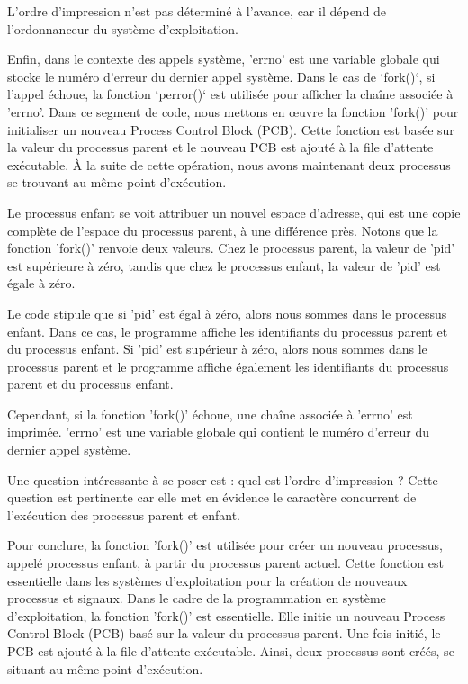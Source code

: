 \documentclass[12pt]{article}
\begin{document}
L'ordre d'impression n'est pas déterminé à l'avance, car il dépend de l'ordonnanceur du système d'exploitation.

Enfin, dans le contexte des appels système, 'errno' est une variable globale qui stocke le numéro d'erreur du dernier appel système. Dans le cas de `fork()`, si l'appel échoue, la fonction `perror()` est utilisée pour afficher la chaîne associée à 'errno'.
Dans ce segment de code, nous mettons en œuvre la fonction 'fork()' pour initialiser un nouveau Process Control Block (PCB). Cette fonction est basée sur la valeur du processus parent et le nouveau PCB est ajouté à la file d'attente exécutable. À la suite de cette opération, nous avons maintenant deux processus se trouvant au même point d'exécution.

Le processus enfant se voit attribuer un nouvel espace d'adresse, qui est une copie complète de l'espace du processus parent, à une différence près. Notons que la fonction 'fork()' renvoie deux valeurs. Chez le processus parent, la valeur de 'pid' est supérieure à zéro, tandis que chez le processus enfant, la valeur de 'pid' est égale à zéro.

Le code stipule que si 'pid' est égal à zéro, alors nous sommes dans le processus enfant. Dans ce cas, le programme affiche les identifiants du processus parent et du processus enfant. Si 'pid' est supérieur à zéro, alors nous sommes dans le processus parent et le programme affiche également les identifiants du processus parent et du processus enfant.

Cependant, si la fonction 'fork()' échoue, une chaîne associée à 'errno' est imprimée. 'errno' est une variable globale qui contient le numéro d'erreur du dernier appel système.

Une question intéressante à se poser est : quel est l'ordre d'impression ? Cette question est pertinente car elle met en évidence le caractère concurrent de l'exécution des processus parent et enfant.

Pour conclure, la fonction 'fork()' est utilisée pour créer un nouveau processus, appelé processus enfant, à partir du processus parent actuel. Cette fonction est essentielle dans les systèmes d'exploitation pour la création de nouveaux processus et signaux.
Dans le cadre de la programmation en système d'exploitation, la fonction 'fork()' est essentielle. Elle initie un nouveau Process Control Block (PCB) basé sur la valeur du processus parent. Une fois initié, le PCB est ajouté à la file d'attente exécutable. Ainsi, deux processus sont créés, se situant au même point d'exécution.
\end{document}
